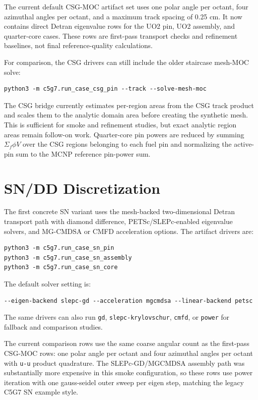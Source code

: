 \documentclass[11pt]{article}
\newcommand{\code}[1]{\texttt{#1}}
\begin{document}
The current default CSG-MOC artifact set uses one polar angle per octant, four
azimuthal angles per octant, and a maximum track spacing of 0.25 cm.  It now
contains direct Detran eigenvalue rows for the UO2 pin, UO2 assembly, and
quarter-core cases.  These rows are first-pass transport checks and refinement
baselines, not final reference-quality calculations.

For comparison, the CSG drivers can still include the older staircase mesh-MOC
solve:

\begin{verbatim}
python3 -m c5g7.run_case_csg_pin --track --solve-mesh-moc
\end{verbatim}

The CSG bridge currently estimates per-region areas from the CSG track product
and scales them to the analytic domain area before creating the synthetic mesh.
This is sufficient for smoke and refinement studies, but exact analytic region
areas remain follow-on work.  Quarter-core pin powers are reduced by summing
\(\Sigma_f \phi V\) over the CSG regions belonging to each fuel pin and
normalizing the active-pin sum to the MCNP reference pin-power sum.

\section*{SN/DD Discretization}

The first concrete SN variant uses the mesh-backed two-dimensional Detran
transport path with diamond difference, PETSc/SLEPc-enabled eigenvalue solvers,
and MG-CMDSA or CMFD acceleration options.  The artifact drivers are:

\begin{verbatim}
python3 -m c5g7.run_case_sn_pin
python3 -m c5g7.run_case_sn_assembly
python3 -m c5g7.run_case_sn_core
\end{verbatim}

The default solver setting is:
\begin{verbatim}
--eigen-backend slepc-gd --acceleration mgcmdsa --linear-backend petsc
\end{verbatim}
The same drivers can also run
\code{gd}, \code{slepc-krylovschur}, \code{cmfd}, or \code{power} for fallback
and comparison studies.

The current comparison rows use the same coarse angular count as the first-pass
CSG-MOC rows: one polar angle per octant and four azimuthal angles per octant
with \code{u-u} product quadrature.  The SLEPc-GD/MGCMDSA assembly path was
substantially more expensive in this smoke configuration, so these rows use
power iteration with one gauss-seidel outer sweep per eigen step, matching the
legacy C5G7 SN example style.
\end{document}
